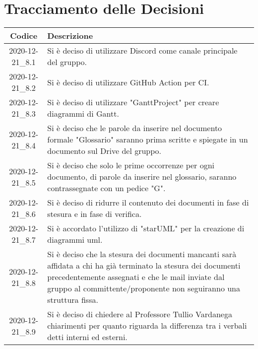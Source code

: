\section*{Tracciamento delle Decisioni}

\begin{center}
	\begin{longtable}{|c|p{13cm}|}
	\hline
	\rowcolor{lighter-grayer}
	\textbf{Codice} & \textbf{Descrizione} \\
	\hline
	\endfirsthead

	
	2020-12-21\_8.1 & Si è deciso di utilizzare Discord come canale principale del gruppo. \\
	\hline
	2020-12-21\_8.2 & Si è deciso di utilizzare GitHub Action per CI. \\
	\hline
	2020-12-21\_8.3 & Si è deciso di utilizzare "GanttProject" per creare diagrammi di Gantt.  \\
	\hline
	2020-12-21\_8.4 & Si è deciso che le parole da inserire nel documento formale "Glossario" saranno prima scritte e spiegate in un documento sul Drive del gruppo.  \\
	\hline
	2020-12-21\_8.5 & Si è deciso che solo le prime occorrenze per ogni documento, di parole da inserire nel glossario, saranno contrassegnate con un pedice "G". \\
	\hline
	2020-12-21\_8.6 & Si è deciso di ridurre il contenuto dei documenti in fase di stesura e in fase di verifica. \\
	\hline
	2020-12-21\_8.7 & Si è accordato l'utilizzo di "starUML" per la creazione di diagrammi uml.  \\
	\hline
	2020-12-21\_8.8 & Si è deciso che la stesura dei documenti mancanti sarà affidata a chi ha già terminato la stesura dei documenti precedentemente assegnati e che le mail inviate dal gruppo al committente/proponente non seguiranno una struttura fissa.  \\
	\hline
	2020-12-21\_8.9 & Si è deciso di chiedere al Professore Tullio Vardanega chiarimenti per quanto riguarda la differenza tra i verbali detti interni ed esterni.  \\
	\hline

	\end{longtable}
\end{center}
